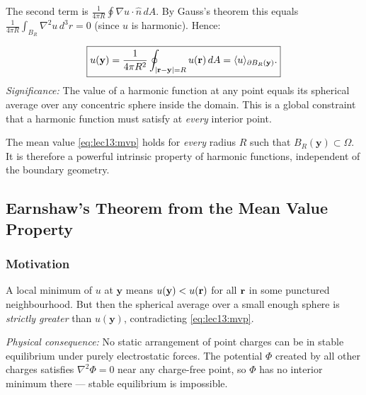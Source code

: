The second term is $\frac{1}{4\pi R}\oint \nabla u \cdot \hat{n}\, dA$.  By Gauss's theorem
this equals $\frac{1}{4\pi R}\int_{B_R}\nabla^2 u\,d^3r = 0$ (since $u$ is harmonic).
Hence:

\begin{equation}\label{eq:lec13:mvp}
  \boxed{
    u(\mathbf{y}) = \frac{1}{4\pi R^2}\oint_{|\mathbf{r}-\mathbf{y}|=R} u(\mathbf{r})\,dA
    = \langle u \rangle_{\partial B_R(\mathbf{y})}.
  }
\end{equation}
\textit{Significance:} The value of a harmonic function at any point equals its spherical
average over any concentric sphere inside the domain.  This is a global constraint
that a harmonic function must satisfy at \emph{every} interior point.

\begin{remark}
  The mean value \eqref{eq:lec13:mvp} holds for \emph{every} radius $R$ such that
  $B_R(\mathbf{y})\subset\Omega$.  It is therefore a powerful intrinsic property of
  harmonic functions, independent of the boundary geometry.
\end{remark}

\subsection{Earnshaw's Theorem from the Mean Value Property}\label{subsec:lec13-earnshaw}

\subsubsection*{Motivation}
A local minimum of $u$ at $\mathbf{y}$ means $u(\mathbf{y}) < u(\mathbf{r})$ for all $\mathbf{r}$ in some
punctured neighbourhood.  But then the spherical average over a small enough sphere is
\emph{strictly greater} than $u(\mathbf{y})$, contradicting \eqref{eq:lec13:mvp}.


\textit{Physical consequence:} No static arrangement of point charges can be in stable
equilibrium under purely electrostatic forces.  The potential $\Phi$ created by all
other charges satisfies $\nabla^2\Phi=0$ near any charge-free point, so $\Phi$ has no
interior minimum there — stable equilibrium is impossible.

